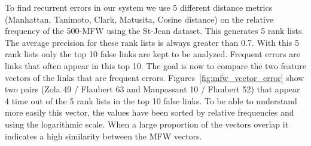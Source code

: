 To find recurrent errors in our system we use 5 different distance metrics (Manhattan, Tanimoto, Clark, Matusita, Cosine distance) on the relative frequency of the 500-MFW using the St-Jean dataset.
This generates 5 rank lists.
The average precision for these rank lists is always greater than 0.7.
With this 5 rank lists only the top 10 false links are kept to be analyzed.
Frequent errors are links that often appear in this top 10.
The goal is now to compare the two feature vectors of the links that are frequent errors.
Figures~\ref{fig:mfw_vector_error} show two pairs (Zola 49 / Flaubert 63 and Maupassant 10 / Flaubert 52) that appear 4 time out of the 5 rank lists in the top 10 false links.
To be able to understand more easily this vector, the values have been sorted by relative frequencies and using the logarithmic scale.
When a large proportion of the vectors overlap it indicates a high similarity between the MFW vectors.

